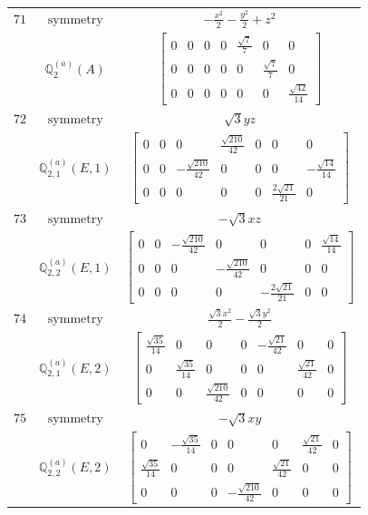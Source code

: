 \documentclass[fleqn,8pt,landscape]{jsarticle}
\begin{document}
\begin{longtable}{ccc}
$ 71 $ & $ \text{symmetry} $ & $ - \frac{x^{2}}{2} - \frac{y^{2}}{2} + z^{2} $ \\
$  $ & $ \mathbb{Q}_{2}^{(a)}(A) $ & $ \begin{bmatrix} 0 & 0 & 0 & 0 & \frac{\sqrt{7}}{7} & 0 & 0 \\ 0 & 0 & 0 & 0 & 0 & \frac{\sqrt{7}}{7} & 0 \\ 0 & 0 & 0 & 0 & 0 & 0 & \frac{\sqrt{42}}{14} \end{bmatrix} $ \\ \hline
$ 72 $ & $ \text{symmetry} $ & $ \sqrt{3} y z $ \\
$  $ & $ \mathbb{Q}_{2,1}^{(a)}(E,1) $ & $ \begin{bmatrix} 0 & 0 & 0 & \frac{\sqrt{210}}{42} & 0 & 0 & 0 \\ 0 & 0 & - \frac{\sqrt{210}}{42} & 0 & 0 & 0 & - \frac{\sqrt{14}}{14} \\ 0 & 0 & 0 & 0 & 0 & \frac{2 \sqrt{21}}{21} & 0 \end{bmatrix} $ \\ \hline
$ 73 $ & $ \text{symmetry} $ & $ - \sqrt{3} x z $ \\
$  $ & $ \mathbb{Q}_{2,2}^{(a)}(E,1) $ & $ \begin{bmatrix} 0 & 0 & - \frac{\sqrt{210}}{42} & 0 & 0 & 0 & \frac{\sqrt{14}}{14} \\ 0 & 0 & 0 & - \frac{\sqrt{210}}{42} & 0 & 0 & 0 \\ 0 & 0 & 0 & 0 & - \frac{2 \sqrt{21}}{21} & 0 & 0 \end{bmatrix} $ \\ \hline
$ 74 $ & $ \text{symmetry} $ & $ \frac{\sqrt{3} x^{2}}{2} - \frac{\sqrt{3} y^{2}}{2} $ \\
$  $ & $ \mathbb{Q}_{2,1}^{(a)}(E,2) $ & $ \begin{bmatrix} \frac{\sqrt{35}}{14} & 0 & 0 & 0 & - \frac{\sqrt{21}}{42} & 0 & 0 \\ 0 & \frac{\sqrt{35}}{14} & 0 & 0 & 0 & \frac{\sqrt{21}}{42} & 0 \\ 0 & 0 & \frac{\sqrt{210}}{42} & 0 & 0 & 0 & 0 \end{bmatrix} $ \\ \hline
$ 75 $ & $ \text{symmetry} $ & $ - \sqrt{3} x y $ \\
$  $ & $ \mathbb{Q}_{2,2}^{(a)}(E,2) $ & $ \begin{bmatrix} 0 & - \frac{\sqrt{35}}{14} & 0 & 0 & 0 & \frac{\sqrt{21}}{42} & 0 \\ \frac{\sqrt{35}}{14} & 0 & 0 & 0 & \frac{\sqrt{21}}{42} & 0 & 0 \\ 0 & 0 & 0 & - \frac{\sqrt{210}}{42} & 0 & 0 & 0 \end{bmatrix} $ \\ \hline

\end{longtable}
\end{document}
